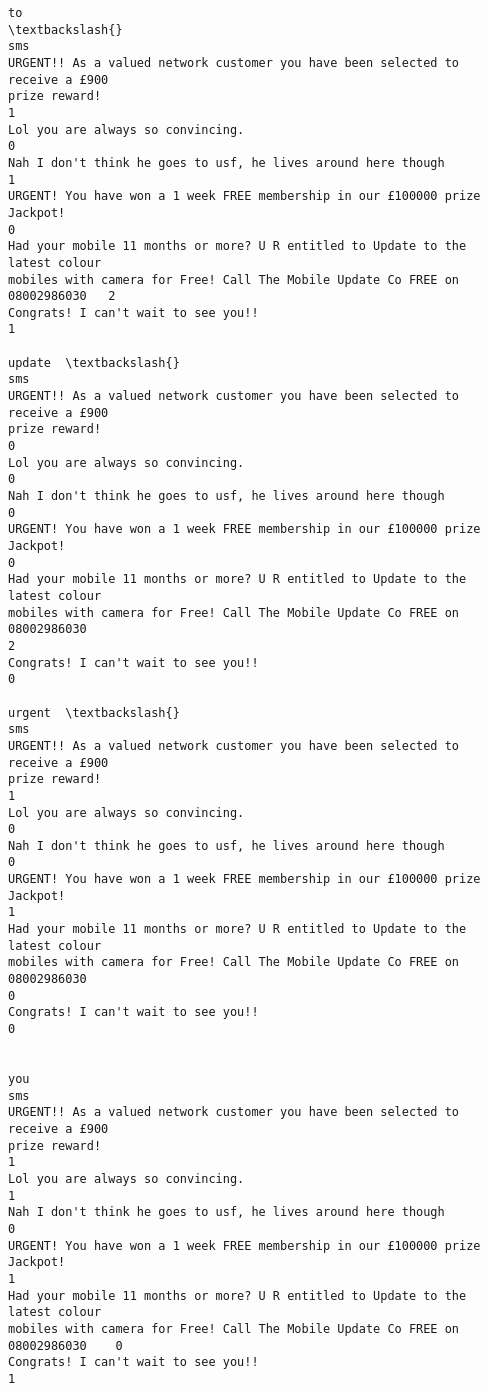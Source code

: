 \documentclass[11pt]{article}
\begin{document}
\begin{tcolorbox}[breakable, size=fbox, boxrule=.5pt, pad at break*=1mm, opacityfill=0]
\begin{Verbatim}[commandchars=\\\{\}]
                                                                            to
\textbackslash{}
sms
URGENT!! As a valued network customer you have been selected to receive a £900
prize reward!                                                                 1
Lol you are always so convincing.
0
Nah I don't think he goes to usf, he lives around here though
1
URGENT! You have won a 1 week FREE membership in our £100000 prize Jackpot!
0
Had your mobile 11 months or more? U R entitled to Update to the latest colour
mobiles with camera for Free! Call The Mobile Update Co FREE on 08002986030   2
Congrats! I can't wait to see you!!
1

update  \textbackslash{}
sms
URGENT!! As a valued network customer you have been selected to receive a £900
prize reward!
0
Lol you are always so convincing.
0
Nah I don't think he goes to usf, he lives around here though
0
URGENT! You have won a 1 week FREE membership in our £100000 prize Jackpot!
0
Had your mobile 11 months or more? U R entitled to Update to the latest colour
mobiles with camera for Free! Call The Mobile Update Co FREE on 08002986030
2
Congrats! I can't wait to see you!!
0

urgent  \textbackslash{}
sms
URGENT!! As a valued network customer you have been selected to receive a £900
prize reward!
1
Lol you are always so convincing.
0
Nah I don't think he goes to usf, he lives around here though
0
URGENT! You have won a 1 week FREE membership in our £100000 prize Jackpot!
1
Had your mobile 11 months or more? U R entitled to Update to the latest colour
mobiles with camera for Free! Call The Mobile Update Co FREE on 08002986030
0
Congrats! I can't wait to see you!!
0

                                                                            you
sms
URGENT!! As a valued network customer you have been selected to receive a £900
prize reward!                                                                  1
Lol you are always so convincing.
1
Nah I don't think he goes to usf, he lives around here though
0
URGENT! You have won a 1 week FREE membership in our £100000 prize Jackpot!
1
Had your mobile 11 months or more? U R entitled to Update to the latest colour
mobiles with camera for Free! Call The Mobile Update Co FREE on 08002986030    0
Congrats! I can't wait to see you!!
1
\end{Verbatim}
\end{tcolorbox}
        
\end{document}
